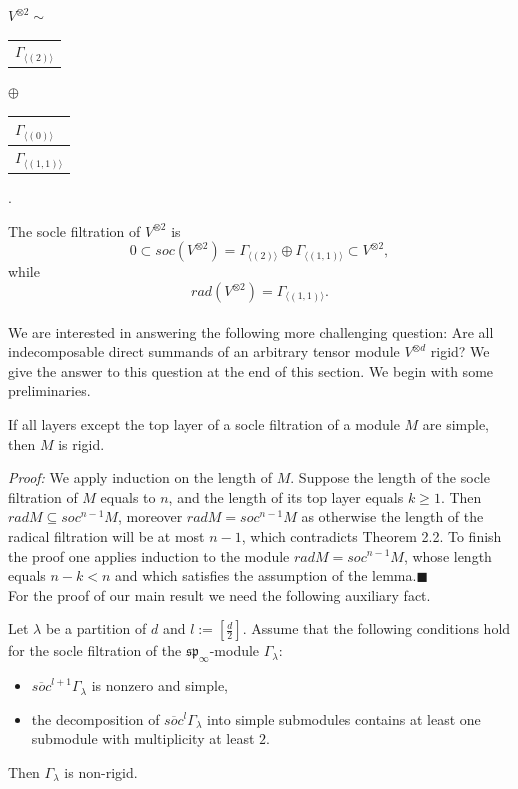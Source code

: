 \begin{center}
$V^{\otimes 2} \sim    $ 
 \begin{tabular}{ |l| }
  \hline
   \\
  \hline
  $\Gamma_{\langle(2)\rangle}$
  \\ \hline
\end{tabular}
$\oplus$
\begin{tabular}{ |l| }
  \hline
  $\Gamma_{\langle(0)\rangle}$
   \\
  \hline
  $\Gamma_{\langle(1,1)\rangle}$
  \\ \hline
\end{tabular}.
\end{center}
The socle filtration of $V^{\otimes2}$ is
$$0\subset soc(V^{\otimes2})=\Gamma_{\langle(2)\rangle}\oplus\Gamma_{\langle(1,1)\rangle} \subset V^{\otimes2},$$ while $$ rad(V^{\otimes2})= \Gamma_{\langle(1,1)\rangle}.$$
\\We are interested in answering the following more challenging question: Are all indecomposable direct summands of an arbitrary tensor module $V^{\otimes d}$ rigid? We give the answer to this question at the end of this section. We begin with some preliminaries.
\begin{lem}
If all layers except the top layer of a socle filtration of a module $M$ are simple, then $M$ is rigid.

\end{lem}
\emph{Proof:} We apply induction on the length of $M$. Suppose the length of the socle filtration of $M$  equals to $n$, and the length of its top layer equals $k\geq 1$. Then $radM\subseteq soc^{n-1}M$, moreover $radM=soc^{n-1}M$ as otherwise the length of the radical filtration will be at most $n-1$, which contradicts Theorem 2.2. To finish the proof one applies induction to the module $radM=soc^{n-1}M$, whose length equals $n-k<n$ and which satisfies the assumption of the lemma.$\blacksquare$
\\For the proof of our main result we need the following auxiliary fact.
\begin{prop}
Let $\lambda$ be a partition of $d$ and $l:=[\frac{d}{2}]$. Assume that the following conditions hold for the socle filtration of the $\mathfrak{sp}_{\infty}$-module $\Gamma_{\lambda}$:
\begin{itemize}
\item $\overline{soc}^{l+1}\Gamma_{\lambda}$ is nonzero and simple,
\item the decomposition of $\overline{soc}^{l}\Gamma_{\lambda}$ into simple submodules contains at least one submodule with multiplicity at least $2$. 
\end{itemize}
Then $\Gamma_{\lambda}$ is non-rigid.
\end{prop}
